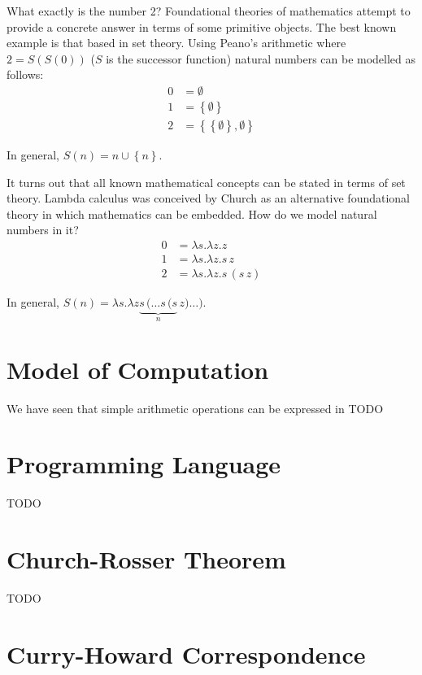 \documentclass[11pt,twoside,a4paper]{article} %
\begin{document}
What exactly is the number 2? Foundational theories of mathematics attempt to 
provide a concrete answer in terms of some primitive objects. The best known 
example is that based in set theory. Using Peano's arithmetic where $2=S(S(0))$
($S$ is the successor function) natural numbers can be modelled as follows:
\begin{align*}
0 &= \emptyset \\
1 &= \left\{\emptyset\right\} \\
2 &= \left\{\left\{\emptyset\right\}, \emptyset\right\}
\end{align*}

\begin{mdframed}
In general, $S(n) = n \cup \left\{n\right\}$.
\end{mdframed}

It turns out that all known mathematical concepts can be stated in terms of 
set theory. Lambda calculus was conceived by Church as an alternative 
foundational theory in which mathematics can be embedded\cite{grue97}. 
How do we model natural numbers in it?
\begin{align*}
0 &= \lambda s.\lambda z.z \\
1 &= \lambda s.\lambda z.s\,z \\
2 &= \lambda s.\lambda z.s\,(s\,z)
\end{align*}

\begin{mdframed}
In general, $S(n) = \lambda s.\lambda z\underbrace{s\,(\dots s\,(s}_n\,z)\dots)$.
\end{mdframed}

\section{Model of Computation}

We have seen that simple arithmetic operations can be expressed in 
TODO

\section{Programming Language}

TODO

\section{Church-Rosser Theorem}

TODO

\section{Curry-Howard Correspondence}
\end{document}
